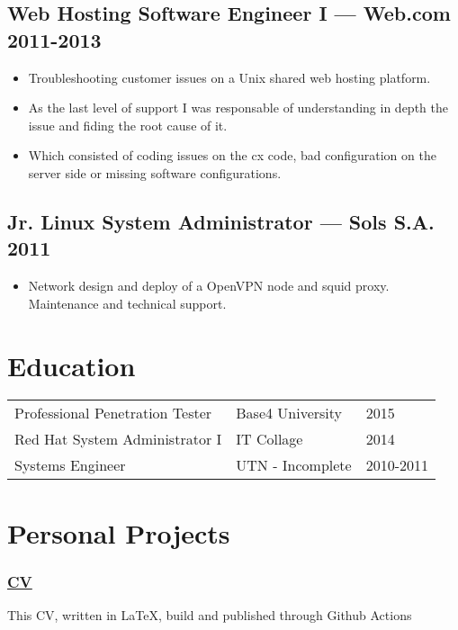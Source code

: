 \documentclass[11pt]{article}
\newcommand{\git}[2]{\href {https://github.com/azimut/{#2}} {#1}}
\begin{document}
\subsection{Web Hosting Software Engineer I --- Web.com \hfill 2011-2013}
\begin{itemize}
  \setlength{\parskip}{0pt}
  \setlength{\itemsep}{0pt plus 1pt}
\item Troubleshooting customer issues on a Unix shared web hosting platform.
\item As the last level of support I was responsable of understanding in depth the issue and fiding the root cause of it.
\item Which consisted of coding issues on the cx code, bad configuration on the server side or missing software configurations.
\end{itemize}

\subsection{Jr. Linux System Administrator --- Sols S.A. \hfill 2011}
\begin{itemize}
  \setlength{\parskip}{0pt}
  \setlength{\itemsep}{0pt plus 1pt}
\item Network design and deploy of a OpenVPN node and squid proxy. Maintenance and technical support.
\end{itemize}


\section{Education}


\begin{tabular}{@{}lll@{}}
  \hspace{.1em} Professional Penetration Tester & Base4 University & 2015 \\
  \hspace{.1em} Red Hat System Administrator I  & IT Collage       & 2014 \\
  \hspace{.1em} Systems Engineer                & UTN - Incomplete & 2010-2011\\
\end{tabular}


\section{Personal Projects}

\subsubsection{\git{CV}{CV}}
This CV, written in LaTeX, build and published through Github Actions
\end{document}
